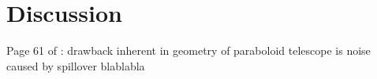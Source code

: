 \section{Discussion}
Page 61 of \cite{burke_introduction_2013}: drawback inherent in geometry of paraboloid telescope is noise caused by spillover blablabla